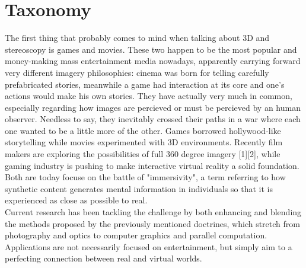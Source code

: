 \section{Taxonomy}
The first thing that probably comes to mind when talking about 3D and stereoscopy is games and movies. These two happen to be the most popular and money-making mass entertainment media nowadays, apparently carrying forward very different imagery philosophies: cinema was born for telling carefully prefabricated stories, meanwhile a game had interaction at its core and one’s actions would make his own stories. They have actually very much in common, especially regarding how images are percieved or must be percieved by an human observer. Needless to say, they inevitably crossed their paths in a war where each one wanted to be a little more of the other. Games borrowed hollywood-like storytelling while movies experimented with 3D environments. Recently film makers are exploring the possibilities of full 360 degree imagery [1][2], while gaming industry is pushing to make interactive virtual reality a solid foundation. Both are today focuse on the battle of "immersivity", a term referring to how synthetic content generates mental information in individuals so that it is experienced as close as possible to real.\\
Current research has been tackling the challenge by both enhancing and blending the methods proposed by the previously mentioned doctrines, which stretch from photography and optics to computer graphics and parallel computation. Applications are not necessarily focused on entertainment, but simply aim to a perfecting connection between real and virtual worlds.

